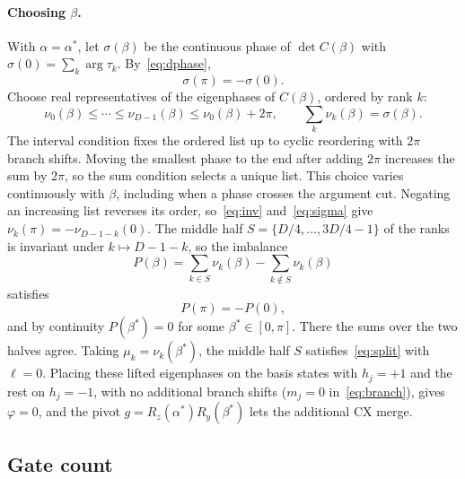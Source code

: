 \documentclass[11pt]{article}
\begin{document}
\paragraph{Choosing $\beta$.} With $\alpha=\alpha^\ast$, let $\sigma(\beta)$ be the continuous phase
of $\det C(\beta)$ with $\sigma(0)=\sum_k\arg\tau_k$. By~\eqref{eq:dphase},
\begin{equation}\label{eq:sigma}
\sigma(\pi)=-\sigma(0).
\end{equation}
Choose real representatives of the eigenphases of $C(\beta)$, ordered by rank $k$:
\begin{equation}\label{eq:nu}
\nu_0(\beta)\le\cdots\le\nu_{D-1}(\beta)\le\nu_0(\beta)+2\pi,\qquad
\sum_k\nu_k(\beta)=\sigma(\beta).
\end{equation}
The interval condition fixes the ordered list up to cyclic reordering with $2\pi$ branch
shifts. Moving the smallest phase to the end after adding $2\pi$ increases the sum by $2\pi$,
so the sum condition selects a unique list. This choice varies continuously with $\beta$,
including when a phase crosses the argument cut. Negating an increasing list reverses its
order, so~\eqref{eq:inv} and~\eqref{eq:sigma} give $\nu_k(\pi)=-\nu_{D-1-k}(0)$. The middle
half $S=\{D/4,\dots,3D/4-1\}$ of the ranks is invariant under $k\mapsto D-1-k$, so the imbalance
\begin{equation}\label{eq:P}
P(\beta)=\sum_{k\in S}\nu_k(\beta)-\sum_{k\notin S}\nu_k(\beta)
\end{equation}
satisfies
\begin{equation}\label{eq:sign}
P(\pi)=-P(0),
\end{equation}
and by continuity $P(\beta^\ast)=0$ for some $\beta^\ast\in[0,\pi]$. There the sums over the
two halves agree. Taking
$\mu_k=\nu_k(\beta^\ast)$, the middle half $S$ satisfies~\eqref{eq:split} with $\ell=0$. Placing
these lifted eigenphases on the basis states with $h_j=+1$ and the rest on $h_j=-1$, with no
additional branch shifts
($m_j=0$ in~\eqref{eq:branch}), gives $\varphi=0$, and the pivot $g=R_z(\alpha^\ast)R_y(\beta^\ast)$
lets the additional CX merge.

\subsection{Gate count}\label{sec:count}
\end{document}
